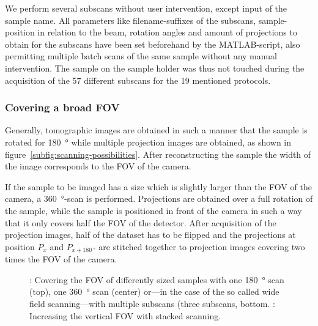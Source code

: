 We perform several subscans without user intervention, except input of the sample name. All parameters like filename-suffixes of the subscans, sample-position in relation to the beam, rotation angles and amount of projections to obtain for the subscans have been set beforehand by the MATLAB-script, also permitting multiple batch scans of the same sample without any manual intervention. The sample on the sample holder was thus not touched during the acquisition of the 57 different subscans for the 19 mentioned protocols. 

\subsubsection{Covering a broad FOV}
\label{subsec:covering a broad fov}
Generally, tomographic images are obtained in such a manner that the sample is rotated for \SI{180}{\degree} while multiple projection images are obtained, as shown in figure~\ref{subfig:scanning-possibilities}. After reconstructing the sample the width of the image corresponds to the FOV of the camera.

If the sample to be imaged has a size which is slightly larger than the FOV of the camera, a \SI{360}{\degree}-scan is performed. Projections are obtained over a full rotation of the sample, while the sample is positioned in front of the camera in such a way that it only covers half the FOV of the detector. After acquisition of the projection images, half of the dataset has to be flipped and the projections at position $P_{x}$ and $P_{x+\SI{180}{\degree}}$ are stitched together to projection images covering two times the FOV of the camera.

\begin{figure*}
	\noindent{}%
	\caption{: Covering the FOV of differently sized samples with one \SI{180}{\degree} scan (top), one \SI{360}{\degree} scan (center) or---in the case of the so called wide field scanning---with multiple subscans (three subscans, bottom. : Increasing the vertical FOV with stacked scanning.}%
	\label{fig:scanning-possibilities}%
\end{figure*}

